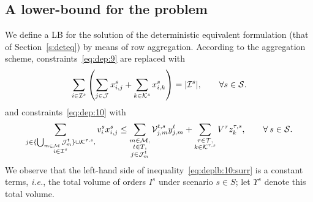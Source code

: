 \documentclass[a4paper,11pt]{article}
\begin{document}
	\subsection{A lower-bound for the problem}\label{ss:problb}
	We define a LB for the solution of the deterministic equivalent formulation (that of Section~\ref{s:deteq}) by means of row aggregation.
	According to the aggregation scheme, constraints~\eqref{eq:dep:9} are replaced with
	\begin{equation}\label{eq:dep:9:surr}
		\sum\limits_{i \in {\cal I}^{s}} \left( \sum\limits_{j \in \cal J}x_{i,j}^{s} + \sum\limits_{k \in {\cal K}^{s}}x_{i,k}^{s} \right) = | {\cal I}^{s}|, \qquad \forall s \in {\cal S}.
	\end{equation}
	and constraints~\eqref{eq:dep:10} with
	\begin{equation}\label{eq:deplb:10:surr}
		\sum\limits_{\substack{j \in \{\bigcup_{m \in {\cal M}} {\cal J}^t_{m}\} \cup {\cal K}^{\tau,s}, \\ i \in {\cal I}^{s}}} v_i^{s} x_{i,j}^{s} 
		\leq \sum\limits_{\substack{ m \in {\cal M}, \\ t \in T, \\ j \in {\cal J}^t_{m}}} {\cal V}_{j,m}^{t,s} y_{j,m}^t + \sum\limits_{\substack{\tau \in {\cal T}, \\ k \in {\cal K}^{\tau,s}}} V^{\tau} z_k^{\tau,s}, \qquad \forall \: s \in {\cal S}.
	\end{equation}
	We observe that the left-hand side of inequality~\eqref{eq:deplb:10:surr} is a constant terms, \textit{i.e.}, the total volume of orders $ I^s$ under scenario $ s \in S$; let $ \Upsilon^s$ denote this total volume.
	
\end{document}
